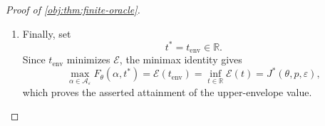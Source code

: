 \documentclass[11pt]{article}
\begin{document}
\begin{proof}[Proof of \cref{obj:thm:finite-oracle}]
\begin{enumerate}
For \(S\in\mathcal S\), define
\[
r_S=\sum_{j=0}^3b_S(x_j)>0.
\]
The dominating measure and conditional densities of this channel
satisfy
\[
\nu_{Q_{\alpha_{\mathrm{opt}}}}(\{S\})
=(\alpha_{\mathrm{opt}})_Sr_S,
\qquad
d_{Q_{\alpha_{\mathrm{opt}}},j}(S)
=
\begin{cases}
b_S(x_j)/r_S,&(\alpha_{\mathrm{opt}})_S>0,\\
0,&(\alpha_{\mathrm{opt}})_S=0.
\end{cases}
\]
The zero-weight outputs have zero dominating mass. At every
positive-weight output, the output density and its derivative are
\[
f_{\theta,Q_{\alpha_{\mathrm{opt}}}}(S)
=\frac{h_S(\theta)}{r_S},
\qquad
\dot f_{\theta,Q_{\alpha_{\mathrm{opt}}}}(S)
=\frac{g_S}{r_S}.
\]
Hence integration over the finite alphabet gives
\[
\begin{aligned}
I_\theta(Q_{\alpha_{\mathrm{opt}}})
&=
\sum_{\substack{S\in\mathcal S\\(\alpha_{\mathrm{opt}})_S>0}}
(\alpha_{\mathrm{opt}})_Sr_S
\frac{g_Sg_S^\top}{h_S(\theta)r_S}\\
&=
\sum_{S\in\mathcal S}
(\alpha_{\mathrm{opt}})_S
\frac{g_Sg_S^\top}{h_S(\theta)}
=
I_\theta(\alpha_{\mathrm{opt}}).
\end{aligned}
\]
Together with the preceding variance calculation, this proves
\[
c^\top I_\theta(Q_{\alpha_{\mathrm{opt}}})^+c
=
c^\top I_\theta(\alpha_{\mathrm{opt}})^+c
=
V^*(\theta,p,\varepsilon).
\]
The universal lower bound and this admissible attaining channel
then yield
\[
\inf_Qc^\top I_\theta(Q)^+c=V^*(\theta,p,\varepsilon),
\]
with the infimum taken over the channel class in the statement.

\item Finally, set
\[
t^*=t_{\mathrm{env}}\in\mathbb R.
\]
Since \(t_{\mathrm{env}}\) minimizes \(\mathscr E\), the minimax identity
gives
\[
\max_{\alpha\in\mathcal A_\varepsilon}
F_\theta(\alpha,t^*)
=
\mathscr E(t_{\mathrm{env}})
=
\inf_{t\in\mathbb R}\mathscr E(t)
=
J^*(\theta,p,\varepsilon),
\]
which proves the asserted attainment of the upper-envelope value.
\end{enumerate}
\end{proof}
\end{document}
